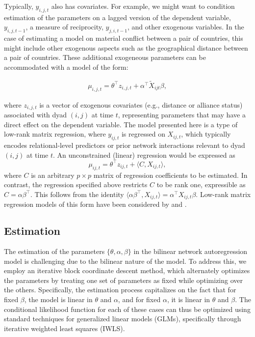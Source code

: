 Typically, $y_{i,j,t}$ also has covariates. For example, we might want to condition estimation of the parameters on a lagged version of the dependent variable, $y_{i,j,t-1}$, a measure of reciprocity, $y_{j,i,t-1}$, and other exogenous variables. In the case of estimating a model on material conflict between a pair of countries, this might include other exogenous aspects such as the geographical distance between a pair of countries. These additional exogeneous parameters can be accommodated with a model of the form:

\begin{align*}
	\mu_{i,j,t} = \theta^{\top} z_{i,j,t} +  \alpha^{\top} \tilde{X}_{ijt} \beta,
\end{align*}

where $z_{i,j,t}$ is a vector of exogenous covariates (e.g., distance or alliance status) associated with dyad $(i,j)$ at time $t$, representing parameters that may have a direct effect on the dependent variable. The model presented here is a type of low-rank matrix regression, where $y_{ij,t}$ is regressed on $X_{ij,t}$, which typically encodes relational-level predictors or prior network interactions relevant to dyad $(i,j)$ at time $t$. An unconstrained (linear) regression would be expressed as 
\[
\mu_{ij,t} = \theta^{\top} z_{ij,t} +  \langle C,  X_{ij,t} \rangle,
\]
where $C$ is an arbitrary $p\times p$ matrix of regression coefficients to be estimated. In contrast, the regression specified above restricts $C$ to be rank one, expressible as $C=\alpha \beta^{\top}$. This follows from the identity $\langle \alpha \beta^{\top}, X_{ij,t} \rangle  = \alpha^{\top} X_{ij,t} \beta$. Low-rank matrix regression models of this form have been considered by \citet{li:etal:2010} and \citet{zhou:etal:2013}.

\subsection*{Estimation}

The estimation of the parameters $\{\theta, \alpha, \beta\}$ in the bilinear network autoregression model is challenging due to the bilinear nature of the model. To address this, we employ an iterative block coordinate descent method, which alternately optimizes the parameters by treating one set of parameters as fixed while optimizing over the others. Specifically, the estimation process capitalizes on the fact that for fixed $\beta$, the model is linear in $\theta$ and $\alpha$, and for fixed $\alpha$, it is linear in $\theta$ and $\beta$. The conditional likelihood function for each of these cases can thus be optimized using standard techniques for generalized linear models (GLMs), specifically through iterative weighted least squares (IWLS).


